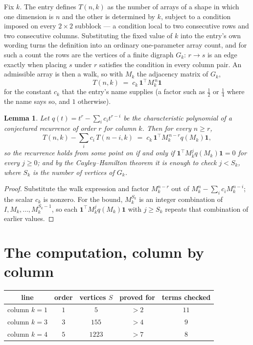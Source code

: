 \documentclass[11pt,a4paper]{article}
\theoremstyle{plain}
\newtheorem{lemma}[theorem]{Lemma}
\theoremstyle{definition}
\begin{document}
Fix $k$. The entry defines $T(n,k)$ as the number of arrays of a shape in which one dimension
is $n$ and the other is determined by $k$, subject to a condition imposed on every
$2\times2$ subblock --- a condition local to two consecutive rows and two consecutive columns.
Substituting the fixed value of $k$ into the entry's own wording turns the definition into an
ordinary one-parameter array count, and for such a count the rows are the vertices of a finite
digraph $G_k$: $r\to s$ is an edge exactly when placing $s$ under $r$ satisfies the condition
in every column pair. An admissible array is then a walk, so with $M_k$ the adjacency matrix
of $G_k$,
\[
T(n,k)\;=\;c_k\,\mathbf{1}^{\!\top}M_k^{\,n}\mathbf{1}
\]
for the constant $c_k$ that the entry's name supplies (a factor such as $\tfrac12$ or
$\tfrac14$ where the name says so, and $1$ otherwise).

\begin{lemma}\label{lem:crit}
Let $q(t)=t^{r}-\sum_i c_it^{r-i}$ be the characteristic polynomial of a conjectured
recurrence of order $r$ for column $k$. Then for every $n\ge r$,
\[
T(n,k)-\sum_i c_i\,T(n-i,k)\;=\;c_k\,\mathbf{1}^{\!\top}M_k^{\,n-r}q(M_k)\mathbf{1},
\]
so the recurrence holds from some point on if and only if
$\mathbf{1}^{\!\top}M_k^{j}q(M_k)\mathbf{1}=0$ for every $j\ge0$; and by the
Cayley--Hamilton theorem it is enough to check $j<S_k$, where $S_k$ is the number of vertices
of $G_k$.
\end{lemma}

\begin{proof}
Substitute the walk expression and factor $M_k^{n-r}$ out of $M_k^{n}-\sum_ic_iM_k^{n-i}$;
the scalar $c_k$ is nonzero. For the bound, $M_k^{S_k}$ is an integer combination of
$I,M_k,\dots,M_k^{S_k-1}$, so each $\mathbf{1}^{\!\top}M_k^{j}q(M_k)\mathbf{1}$ with
$j\ge S_k$ repeats that combination of earlier values.
\end{proof}

\section{The computation, column by column}

\begin{center}
\begin{tabular}{ccccc}
line & order & vertices $S$ & proved for & terms checked \\ \hline
column $k$$=1$ & $1$ & $5$ & $>2$ & $11$ \\
column $k$$=3$ & $3$ & $155$ & $>4$ & $9$ \\
column $k$$=4$ & $5$ & $1223$ & $>7$ & $8$ \\
\end{tabular}
\end{center}
\end{document}
